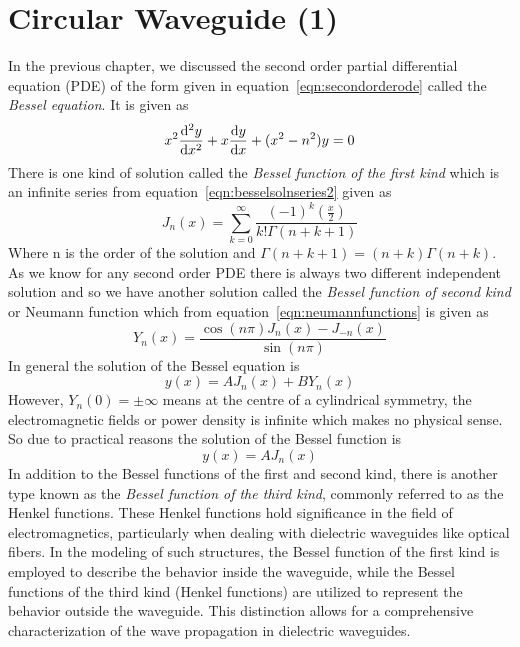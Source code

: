 \chapter{Circular Waveguide (1)}\label{lec:lec44}
In the previous chapter, we discussed the second order partial differential equation (PDE) of the form given in equation~\eqref{eqn:secondorderode} called the \emph{Bessel equation}\label{bessel equation}. It is given as
\begin{equation*}
x^2\derivative[2]{y}{x} + x\derivative{y}{x} + (x^2-n^2)y = 0
\end{equation*}
There is one kind of solution called the \emph{Bessel function of the first kind} which is an infinite series from equation~\eqref{eqn:besselsolnseries2} given as
\begin{equation*}
J_n(x) = \sum^\infty_{k=0} \frac{(-1)^k (\frac{x}{2})}{k!\Gamma(n+k+1)}
\end{equation*}
Where n is the order of the solution and $\Gamma(n+k+1) = (n+k)\Gamma(n+k)$. As we know for any second order PDE there is always two different independent solution and so we have another solution called the \emph{Bessel function of second kind} or Neumann function which from equation~\eqref{eqn:neumannfunctions} is given as 
\[
Y_n(x) = \frac{\cos(n\pi)J_n(x)-J_{-n}(x)}{\sin(n\pi)}
\]
In general the solution of the Bessel equation is
\[
y(x) = A J_n(x) + B Y_n(x)
\]
However, $Y_n(0)=\pm\infty$ means at the centre of a cylindrical symmetry, the electromagnetic fields or power density is infinite which makes no physical sense. So due to practical reasons the solution of the Bessel function is 
\[
y(x) = A J_n(x)
\]
In addition to the Bessel functions of the first and second kind, there is another type known as the \emph{Bessel function of the third kind}, commonly referred to as the Henkel functions. These Henkel functions hold significance in the field of electromagnetics, particularly when dealing with dielectric waveguides like optical fibers. In the modeling of such structures, the Bessel function of the first kind is employed to describe the behavior inside the waveguide, while the Bessel functions of the third kind (Henkel functions) are utilized to represent the behavior outside the waveguide. This distinction allows for a comprehensive characterization of the wave propagation in dielectric waveguides.
 
